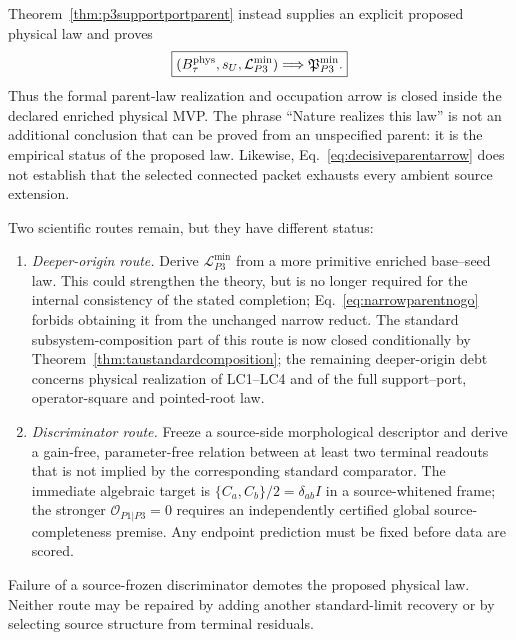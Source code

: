 Theorem~\ref{thm:p3supportportparent} instead supplies an explicit proposed
physical law and proves
\begin{equation}
 \boxed{
 (B_\tau^{\rm phys},s_U,\mathcal L_{P3}^{\min})
 \Longrightarrow \mathfrak P_{P3}^{\min}.
 }
 \label{eq:decisiveparentarrow}
\end{equation}
Thus the formal parent-law realization and occupation arrow is closed inside
the declared enriched physical MVP.  The phrase ``Nature realizes this law''
is not an additional conclusion that can be proved from an unspecified
parent: it is the empirical status of the proposed law.  Likewise,
Eq.~\eqref{eq:decisiveparentarrow} does not establish that the selected
connected packet exhausts every ambient source extension.

Two scientific routes remain, but they have different status:
\begin{enumerate}
\item \emph{Deeper-origin route.}  Derive
  $\mathcal L_{P3}^{\min}$ from a more primitive enriched base--seed law.  This
  could strengthen the theory, but is no longer required for the internal
  consistency of the stated completion; Eq.~\eqref{eq:narrowparentnogo}
  forbids obtaining it from the unchanged narrow reduct.  The standard
  subsystem-composition part of this route is now closed conditionally by
  Theorem~\ref{thm:taustandardcomposition}; the remaining deeper-origin debt
  concerns physical realization of LC1--LC4 and of the full support--port,
  operator-square and pointed-root law.
\item \emph{Discriminator route.}  Freeze a source-side morphological
  descriptor and derive a gain-free, parameter-free relation between at least
  two terminal readouts that is not implied by the corresponding standard
  comparator.  The immediate algebraic target is
  $\{C_a,C_b\}/2=\delta_{ab}I$ in a source-whitened frame; the stronger
  $\mathcal O_{P1|P3}=0$ requires an independently certified global
  source-completeness premise.  Any endpoint prediction must be fixed before
  data are scored.
\end{enumerate}
Failure of a source-frozen discriminator demotes the proposed physical law.
Neither route may be repaired by adding another standard-limit recovery or by
selecting source structure from terminal residuals.
